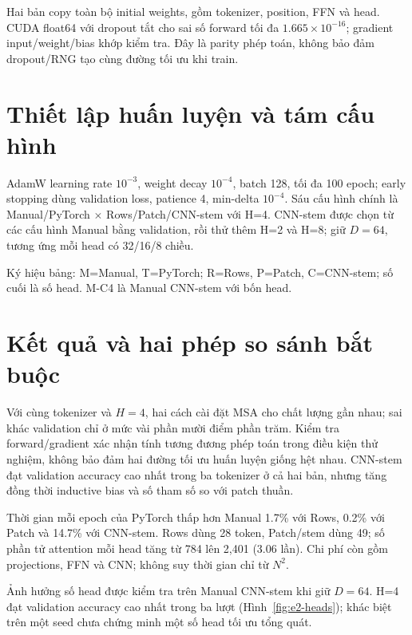Hai bản copy toàn bộ initial weights, gồm tokenizer, position, FFN và head.
CUDA float64 với dropout tắt cho sai số forward tối đa $1.665\times10^{-16}$;
gradient input/weight/bias khớp kiểm tra. Đây là parity phép toán, không bảo đảm
dropout/RNG tạo cùng đường tối ưu khi train.

\section{Thiết lập huấn luyện và tám cấu hình}
AdamW learning rate $10^{-3}$, weight decay $10^{-4}$, batch 128,
tối đa 100 epoch; early stopping dùng validation loss, patience 4,
min-delta $10^{-4}$. Sáu cấu hình chính là Manual/PyTorch $\times$ Rows/Patch/CNN-stem với H=4.
CNN-stem được chọn từ các cấu hình Manual bằng validation, rồi thử thêm
H=2 và H=8; giữ $D=64$, tương ứng mỗi head có 32/16/8 chiều.

Ký hiệu bảng: M=Manual, T=PyTorch; R=Rows, P=Patch, C=CNN-stem;
số cuối là số head. M-C4 là Manual CNN-stem với bốn head.

\section{Kết quả và hai phép so sánh bắt buộc}

Với cùng tokenizer và $H=4$, hai cách cài đặt MSA cho chất lượng gần
nhau; sai khác validation chỉ ở mức vài phần mười điểm phần trăm.
Kiểm tra forward/gradient xác nhận tính tương đương phép toán trong điều kiện
thử nghiệm, không bảo đảm hai đường tối ưu huấn luyện giống hệt nhau.
CNN-stem đạt validation accuracy cao nhất trong ba tokenizer ở cả hai bản,
nhưng tăng đồng thời inductive bias và số tham số so với patch thuần.

Thời gian mỗi epoch của PyTorch thấp hơn Manual 1.7\% với Rows, 0.2\%
với Patch và 14.7\% với CNN-stem. Rows dùng 28 token, Patch/stem dùng 49;
số phần tử attention mỗi head tăng từ 784 lên 2,401 (3.06 lần).
Chi phí còn gồm projections, FFN và CNN; không suy thời gian chỉ từ $N^2$.

Ảnh hưởng số head được kiểm tra trên Manual CNN-stem khi giữ $D=64$.
H=4 đạt validation accuracy cao nhất trong ba lượt (Hình~\ref{fig:e2-heads}); khác biệt trên một seed
chưa chứng minh một số head tối ưu tổng quát.
